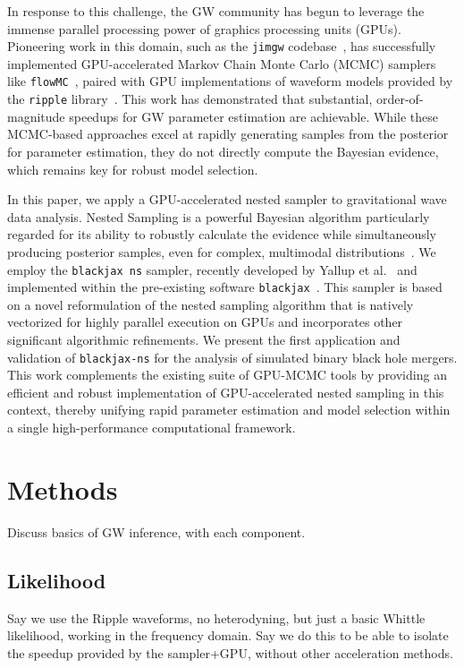 \documentclass[fleqn,usenatbib]{mnras}
\begin{document}
In response to this challenge, the GW community has begun to leverage the immense
parallel processing power of graphics processing units (GPUs). Pioneering work in
this domain, such as the \texttt{jimgw} codebase~\citep{wong2023fastgravitationalwaveparameter}, has successfully
implemented GPU-accelerated Markov Chain Monte Carlo (MCMC) samplers like \texttt{flowMC}~\citep{flowMC}, 
paired with GPU implementations of waveform models provided by the
\texttt{ripple} library~\citep{ripple}. This work has demonstrated that
substantial, order-of-magnitude speedups for GW parameter estimation are
achievable. While these MCMC-based approaches excel at rapidly generating samples
from the posterior for parameter estimation, they do not directly compute the
Bayesian evidence, which remains key for robust model selection.

In this paper, we apply a GPU-accelerated nested sampler to gravitational wave
data analysis. Nested Sampling is a powerful Bayesian algorithm particularly
regarded for its ability to robustly calculate the evidence while simultaneously
producing posterior samples, even for complex, multimodal distributions~\citep{skilling}. 
We employ the \texttt{blackjax ns} sampler,
recently developed by Yallup et al.~\citep{yallup2025nested} and implemented within the pre-existing software 
\texttt{blackjax}~\citep{cabezas2024blackjax}. This sampler is
based on a novel reformulation of the nested sampling algorithm that is natively
vectorized for highly parallel execution on GPUs and incorporates other
significant algorithmic refinements. We present the first application and
validation of \texttt{blackjax-ns} for the analysis of simulated binary black hole mergers.
This work complements the existing suite of GPU-MCMC tools by providing an
efficient and robust implementation of GPU-accelerated nested sampling in this
context, thereby unifying rapid parameter estimation and model selection within
a single high-performance computational framework.

\section{Methods}

Discuss basics of GW inference, with each component.

\subsection{Likelihood}

Say we use the Ripple waveforms, no heterodyning, but just a basic Whittle likelihood, working in the frequency domain. Say we do this to be able to isolate the speedup provided by the sampler+GPU, without other acceleration methods. 
\end{document}
